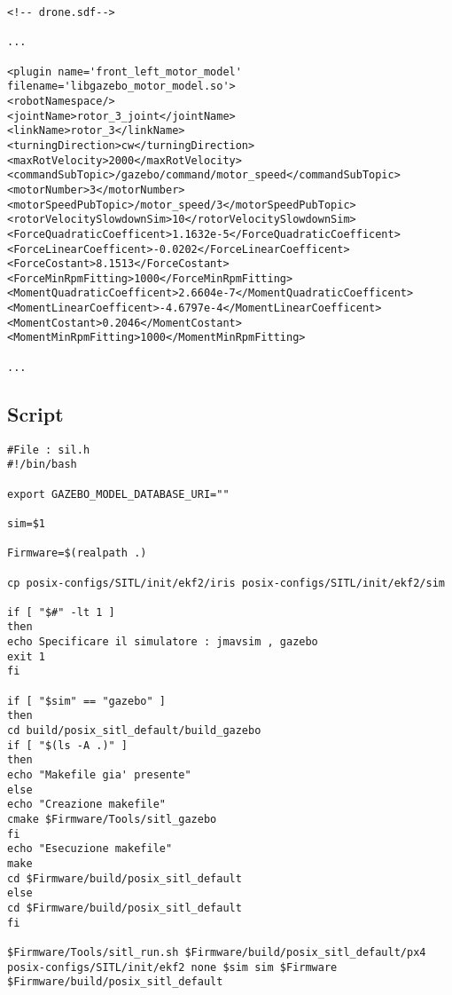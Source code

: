 \lstset{language=XML}
\begin{lstlisting}
<!-- drone.sdf-->

...

<plugin name='front_left_motor_model' filename='libgazebo_motor_model.so'>
<robotNamespace/>
<jointName>rotor_3_joint</jointName>
<linkName>rotor_3</linkName>
<turningDirection>cw</turningDirection>
<maxRotVelocity>2000</maxRotVelocity>
<commandSubTopic>/gazebo/command/motor_speed</commandSubTopic>
<motorNumber>3</motorNumber>
<motorSpeedPubTopic>/motor_speed/3</motorSpeedPubTopic>
<rotorVelocitySlowdownSim>10</rotorVelocitySlowdownSim>
<ForceQuadraticCoefficent>1.1632e-5</ForceQuadraticCoefficent>
<ForceLinearCoefficent>-0.0202</ForceLinearCoefficent>
<ForceCostant>8.1513</ForceCostant>
<ForceMinRpmFitting>1000</ForceMinRpmFitting>
<MomentQuadraticCoefficent>2.6604e-7</MomentQuadraticCoefficent>
<MomentLinearCoefficent>-4.6797e-4</MomentLinearCoefficent>
<MomentCostant>0.2046</MomentCostant>
<MomentMinRpmFitting>1000</MomentMinRpmFitting>

...

\end{lstlisting}

\subsection{Script}

\lstset{language=bash}
\begin{lstlisting}
#File : sil.h
#!/bin/bash

export GAZEBO_MODEL_DATABASE_URI=""

sim=$1

Firmware=$(realpath .)

cp posix-configs/SITL/init/ekf2/iris posix-configs/SITL/init/ekf2/sim

if [ "$#" -lt 1 ]
then
echo Specificare il simulatore : jmavsim , gazebo
exit 1
fi

if [ "$sim" == "gazebo" ] 
then
cd build/posix_sitl_default/build_gazebo
if [ "$(ls -A .)" ]
then
echo "Makefile gia' presente"
else
echo "Creazione makefile"
cmake $Firmware/Tools/sitl_gazebo
fi
echo "Esecuzione makefile"
make
cd $Firmware/build/posix_sitl_default
else
cd $Firmware/build/posix_sitl_default
fi

$Firmware/Tools/sitl_run.sh $Firmware/build/posix_sitl_default/px4  posix-configs/SITL/init/ekf2 none $sim sim $Firmware $Firmware/build/posix_sitl_default
\end{lstlisting}